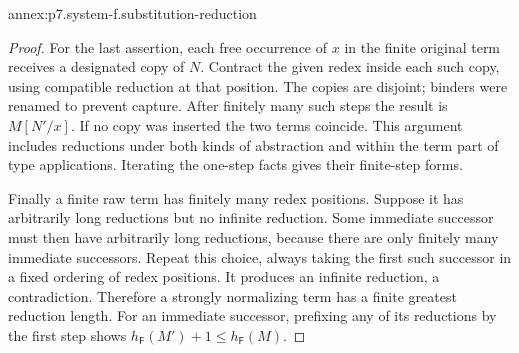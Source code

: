 \begin{annexitem}{annex:p7.system-f.substitution-reduction}
\begin{proof}
For the last assertion, each free occurrence of \(x\) in the finite
original term receives a designated copy of \(N\). Contract the given
redex inside each such copy, using compatible reduction at that position.
The copies are disjoint; binders were renamed to prevent capture.
After finitely many such steps the result is \(M[N'/x]\). If no copy
was inserted the two terms coincide. This argument includes reductions
under both kinds of abstraction and within the term part of type
applications. Iterating the one-step facts gives their finite-step forms.

Finally a finite raw term has finitely many redex positions. Suppose it
has arbitrarily long reductions but no infinite reduction. Some immediate
successor must then have arbitrarily long reductions, because there are
only finitely many immediate successors. Repeat this choice, always taking
the first such successor in a fixed ordering of redex positions. It produces
an infinite reduction, a contradiction. Therefore a strongly normalizing
term has a finite greatest reduction length. For an immediate successor,
prefixing any of its reductions by the first step shows
\(h_{\mathsf F}(M')+1\leq h_{\mathsf F}(M)\).
\end{proof}
\end{annexitem}


